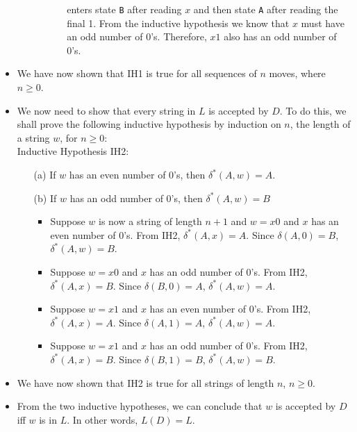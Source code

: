 \documentclass[]{article}
\begin{document}
\begin{itemize}
\begin{enumerate}
\begin{itemize}
\begin{itemize}
                enters state \texttt{B} after reading $x$ and then state
                \texttt{A} after reading the final 1. From the inductive
                hypothesis we know that $x$ must have an odd number of 0's.
                Therefore, $x1$ also has an odd number of 0's.
              \end{itemize}
          \end{itemize}
      \end{enumerate}
    \item We have now shown that IH1 is true for all sequences of $n$ moves,
    where $n \geq 0$.
    \item We now need to show that every string in $L$ is accepted by $D$.
    To do this, we shall prove the following inductive hypothesis by
    induction on $n$, the length of a string $w$, for $n \geq 0$: \\
    Inductive Hypothesis IH2:
      \begin{enumerate}
       \item[(a)] If $w$ has an even number of 0's, then
        $\delta^*(A,w) = A$.
        \item[(b)] If $w$ has an odd number of 0's, then
        $\delta^*(A, w) = B$
          \begin{itemize}
            \item Suppose $w$ is now a string of length $n + 1$ and $w = x0$
            and $x$ has an even number of 0's. From IH2,
            $\delta^*(A, x) = A$. Since $\delta(A, 0) = B$,
            $\delta^*(A, w) = B$.
            \item Suppose $w = x0$ and $x$ has an odd number of 0's. From
            IH2, $\delta^*(A, x) = B$. Since $\delta(B, 0) = A$,
            $\delta^*(A, w) = A$.
            \item Suppose $w = x1$ and $x$ has an even number of 0's. From
            IH2, $\delta^*(A, x) = A$. Since $\delta(A, 1) = A$,
            $\delta^*(A, w) = A$.
            \item Suppose $w = x1$ and $x$ has an odd number of 0's. From
            IH2, $\delta^*(A, x) = B$. Since $\delta(B, 1) = B$,
            $\delta^*(A, w) = B$.
          \end{itemize}
      \end{enumerate}
    \item We have now shown that IH2 is true for all strings of length $n$,
    $n \geq 0$.
    \item From the two inductive hypotheses, we can conclude that $w$ is
    accepted by $D$ iff $w$ is in $L$. In other words, $L(D) = L$.
  \end{itemize}
\end{document}
